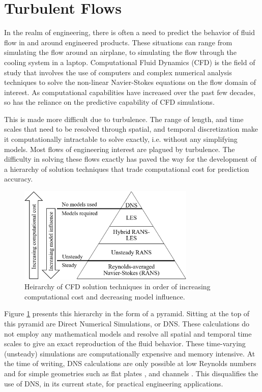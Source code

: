 \section{Turbulent Flows}

In the realm of engineering, there is often a need to predict the behavior of fluid flow in and around engineered products. These situations can range from simulating the flow around an airplane, to simulating the flow through the cooling system in a laptop. Computational Fluid Dynamics (CFD) is the field of study that involves the use of computers and complex numerical analysis techniques to solve the non-linear Navier-Stokes equations on the flow domain of interest. As computational capabilities have increased over the past few decades, so has the reliance on the predictive capability of CFD simulations. 

This is made more difficult due to turbulence. The range of length, and time scales that need to be resolved through spatial, and temporal discretization make it computationally intractable to solve exactly, i.e. without any simplifying models. Most flows of engineering interest are plagued by turbulence. The difficulty in solving these flows exactly has paved the way for the development of a hierarchy of solution techniques that trade computational cost for prediction accuracy. 

\begin{figure}
    \center
    \includegraphics[width=0.75\textwidth]{suthesis/images/solution_heirarchy_simple.png}
    \caption{Heirarchy of CFD solution techniques in order of increasing computational cost and decreasing model influence. \label{fig:cfd_types}}
\end{figure}

Figure \ref{fig:cfd_types} presents this hierarchy in the form of a pyramid. Sitting at the top of this pyramid are Direct Numerical Simulations, or DNS. These calculations do not employ any mathematical models and resolve all spatial and temporal time scales to give an exact reproduction of the fluid behavior. These time-varying (unsteady) simulations are computationally expensive and memory intensive. At the time of writing, DNS calculations are only possible at low Reynolds numbers and for simple geometries such as flat plates \cite{hoyas_reynolds_2008}, and channels \cite{laval_marquillie_dns_channel,marquillie_instability_2011}. This disqualifies the use of DNS, in its current state, for practical engineering applications. 

